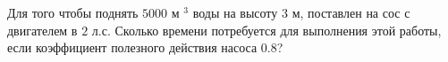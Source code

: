 Для того чтобы поднять $5000$ м $^3$ воды на высоту $3$ м, поставлен на
сос с двигателем в $2$ л.с. Сколько времени потребуется для выполнения 
этой работы, если коэффициент полезного действия насоса $0.8$?

